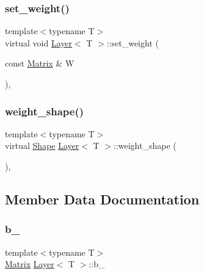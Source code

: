 \mbox{\label{class_layer_a8fd54bf1a860868b13f4365a264c693c}} 
\subsubsection{\texorpdfstring{set\_weight()}{set\_weight()}}
{\footnotesize\ttfamily template$<$typename T$>$ \\
virtual void \mbox{\hyperlink{class_layer}{Layer}}$<$ T $>$\+::set\+\_\+weight (\begin{DoxyParamCaption}\item[{const \mbox{\hyperlink{class_layer_a22b1e7286096aa62bd245536c8ebdaf1}{Matrix}} \&}]{W }\end{DoxyParamCaption})\hspace{0.3cm}{\ttfamily [inline]}, {\ttfamily [virtual]}}

\mbox{\label{class_layer_afa0ec609fc7ef0053a362ea54d0f6f78}} 
\subsubsection{\texorpdfstring{weight\_shape()}{weight\_shape()}}
{\footnotesize\ttfamily template$<$typename T$>$ \\
virtual \mbox{\hyperlink{class_layer_a8313f42d2292d12dd5d40cc115636693}{Shape}} \mbox{\hyperlink{class_layer}{Layer}}$<$ T $>$\+::weight\+\_\+shape (\begin{DoxyParamCaption}{ }\end{DoxyParamCaption})\hspace{0.3cm}{\ttfamily [inline]}, {\ttfamily [virtual]}}



\subsection{Member Data Documentation}
\mbox{\label{class_layer_ab200edbfbb0a0a7ee305d1371feb2815}} 
\subsubsection{\texorpdfstring{b\_}{b\_}}
{\footnotesize\ttfamily template$<$typename T$>$ \\
\mbox{\hyperlink{class_layer_a22b1e7286096aa62bd245536c8ebdaf1}{Matrix}} \mbox{\hyperlink{class_layer}{Layer}}$<$ T $>$\+::b\+\_\+\hspace{0.3cm}{\ttfamily [protected]}}

